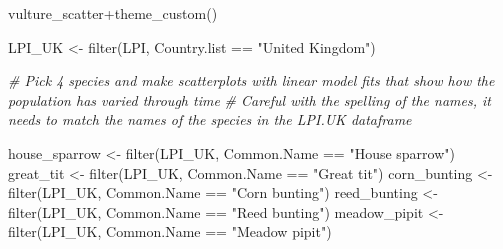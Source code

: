 \documentclass[
]{book}
\newenvironment{Shaded}{\begin{snugshade}}{\end{snugshade}}
\newcommand{\CommentTok}[1]{\textcolor[rgb]{0.56,0.35,0.01}{\textit{#1}}}
\newcommand{\FunctionTok}[1]{\textcolor[rgb]{0.00,0.00,0.00}{#1}}
\newcommand{\NormalTok}[1]{#1}
\newcommand{\OtherTok}[1]{\textcolor[rgb]{0.56,0.35,0.01}{#1}}
\newcommand{\SpecialCharTok}[1]{\textcolor[rgb]{0.00,0.00,0.00}{#1}}
\newcommand{\StringTok}[1]{\textcolor[rgb]{0.31,0.60,0.02}{#1}}
\begin{document}
\begin{Shaded}
\begin{Highlighting}[]
\NormalTok{vulture\_scatter}\SpecialCharTok{+}\FunctionTok{theme\_custom}\NormalTok{()}
\end{Highlighting}
\end{Shaded}

\begin{Shaded}
\begin{Highlighting}[]
\NormalTok{LPI\_UK }\OtherTok{\textless{}{-}} \FunctionTok{filter}\NormalTok{(LPI, Country.list }\SpecialCharTok{==} \StringTok{"United Kingdom"}\NormalTok{)}

\CommentTok{\# Pick 4 species and make scatterplots with linear model fits that show how the population has varied through time}
\CommentTok{\# Careful with the spelling of the names, it needs to match the names of the species in the LPI.UK dataframe}

\NormalTok{house\_sparrow }\OtherTok{\textless{}{-}} \FunctionTok{filter}\NormalTok{(LPI\_UK, Common.Name }\SpecialCharTok{==} \StringTok{"House sparrow"}\NormalTok{)}
\NormalTok{great\_tit }\OtherTok{\textless{}{-}} \FunctionTok{filter}\NormalTok{(LPI\_UK, Common.Name }\SpecialCharTok{==} \StringTok{"Great tit"}\NormalTok{)}
\NormalTok{corn\_bunting }\OtherTok{\textless{}{-}} \FunctionTok{filter}\NormalTok{(LPI\_UK, Common.Name }\SpecialCharTok{==} \StringTok{"Corn bunting"}\NormalTok{)}
\NormalTok{reed\_bunting }\OtherTok{\textless{}{-}} \FunctionTok{filter}\NormalTok{(LPI\_UK, Common.Name }\SpecialCharTok{==} \StringTok{"Reed bunting"}\NormalTok{)}
\NormalTok{meadow\_pipit }\OtherTok{\textless{}{-}} \FunctionTok{filter}\NormalTok{(LPI\_UK, Common.Name }\SpecialCharTok{==} \StringTok{"Meadow pipit"}\NormalTok{)}
\end{Highlighting}
\end{Shaded}
\end{document}
